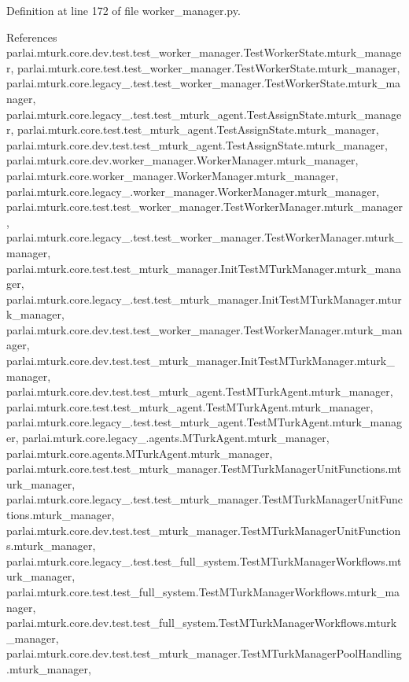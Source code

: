 Definition at line 172 of file worker\+\_\+manager.\+py.



References parlai.\+mturk.\+core.\+dev.\+test.\+test\+\_\+worker\+\_\+manager.\+Test\+Worker\+State.\+mturk\+\_\+manager, parlai.\+mturk.\+core.\+test.\+test\+\_\+worker\+\_\+manager.\+Test\+Worker\+State.\+mturk\+\_\+manager, parlai.\+mturk.\+core.\+legacy\+\_.\+test.\+test\+\_\+worker\+\_\+manager.\+Test\+Worker\+State.\+mturk\+\_\+manager, parlai.\+mturk.\+core.\+legacy\+\_.\+test.\+test\+\_\+mturk\+\_\+agent.\+Test\+Assign\+State.\+mturk\+\_\+manager, parlai.\+mturk.\+core.\+test.\+test\+\_\+mturk\+\_\+agent.\+Test\+Assign\+State.\+mturk\+\_\+manager, parlai.\+mturk.\+core.\+dev.\+test.\+test\+\_\+mturk\+\_\+agent.\+Test\+Assign\+State.\+mturk\+\_\+manager, parlai.\+mturk.\+core.\+dev.\+worker\+\_\+manager.\+Worker\+Manager.\+mturk\+\_\+manager, parlai.\+mturk.\+core.\+worker\+\_\+manager.\+Worker\+Manager.\+mturk\+\_\+manager, parlai.\+mturk.\+core.\+legacy\+\_.\+worker\+\_\+manager.\+Worker\+Manager.\+mturk\+\_\+manager, parlai.\+mturk.\+core.\+test.\+test\+\_\+worker\+\_\+manager.\+Test\+Worker\+Manager.\+mturk\+\_\+manager, parlai.\+mturk.\+core.\+legacy\+\_.\+test.\+test\+\_\+worker\+\_\+manager.\+Test\+Worker\+Manager.\+mturk\+\_\+manager, parlai.\+mturk.\+core.\+test.\+test\+\_\+mturk\+\_\+manager.\+Init\+Test\+M\+Turk\+Manager.\+mturk\+\_\+manager, parlai.\+mturk.\+core.\+legacy\+\_.\+test.\+test\+\_\+mturk\+\_\+manager.\+Init\+Test\+M\+Turk\+Manager.\+mturk\+\_\+manager, parlai.\+mturk.\+core.\+dev.\+test.\+test\+\_\+worker\+\_\+manager.\+Test\+Worker\+Manager.\+mturk\+\_\+manager, parlai.\+mturk.\+core.\+dev.\+test.\+test\+\_\+mturk\+\_\+manager.\+Init\+Test\+M\+Turk\+Manager.\+mturk\+\_\+manager, parlai.\+mturk.\+core.\+dev.\+test.\+test\+\_\+mturk\+\_\+agent.\+Test\+M\+Turk\+Agent.\+mturk\+\_\+manager, parlai.\+mturk.\+core.\+test.\+test\+\_\+mturk\+\_\+agent.\+Test\+M\+Turk\+Agent.\+mturk\+\_\+manager, parlai.\+mturk.\+core.\+legacy\+\_.\+test.\+test\+\_\+mturk\+\_\+agent.\+Test\+M\+Turk\+Agent.\+mturk\+\_\+manager, parlai.\+mturk.\+core.\+legacy\+\_.\+agents.\+M\+Turk\+Agent.\+mturk\+\_\+manager, parlai.\+mturk.\+core.\+agents.\+M\+Turk\+Agent.\+mturk\+\_\+manager, parlai.\+mturk.\+core.\+test.\+test\+\_\+mturk\+\_\+manager.\+Test\+M\+Turk\+Manager\+Unit\+Functions.\+mturk\+\_\+manager, parlai.\+mturk.\+core.\+legacy\+\_.\+test.\+test\+\_\+mturk\+\_\+manager.\+Test\+M\+Turk\+Manager\+Unit\+Functions.\+mturk\+\_\+manager, parlai.\+mturk.\+core.\+dev.\+test.\+test\+\_\+mturk\+\_\+manager.\+Test\+M\+Turk\+Manager\+Unit\+Functions.\+mturk\+\_\+manager, parlai.\+mturk.\+core.\+legacy\+\_.\+test.\+test\+\_\+full\+\_\+system.\+Test\+M\+Turk\+Manager\+Workflows.\+mturk\+\_\+manager, parlai.\+mturk.\+core.\+test.\+test\+\_\+full\+\_\+system.\+Test\+M\+Turk\+Manager\+Workflows.\+mturk\+\_\+manager, parlai.\+mturk.\+core.\+dev.\+test.\+test\+\_\+full\+\_\+system.\+Test\+M\+Turk\+Manager\+Workflows.\+mturk\+\_\+manager, parlai.\+mturk.\+core.\+dev.\+test.\+test\+\_\+mturk\+\_\+manager.\+Test\+M\+Turk\+Manager\+Pool\+Handling.\+mturk\+\_\+manager, 